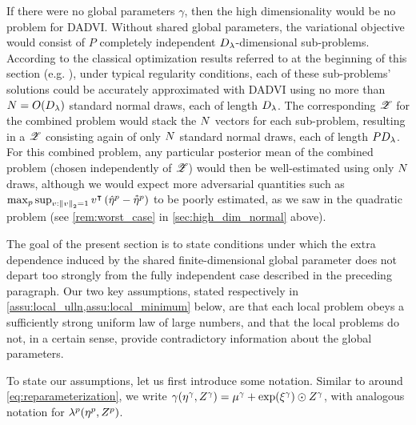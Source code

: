 If there were no global parameters $\gamma$, then the high dimensionality would
be no problem for DADVI.  Without shared global parameters, the variational
objective would consist of $P$ completely independent $D_{\lambda}$-dimensional
sub-problems.  According to the classical optimization results referred to at
the beginning of this section (e.g. \citet[Chapter 5]{shapiro:2021:lectures}),
under typical regularity conditions, each of these sub-problems' solutions could
be accurately approximated with DADVI using no more than $N=O(D_{\lambda})$
standard normal draws, each of length $D_{\lambda}$.  The corresponding $\mathscr{Z}$ for
the combined problem would stack the $N$ vectors for each sub-problem,
resulting in a $\mathscr{Z}$ consisting again of only $N$ standard normal draws, each
of length $P D_{\lambda}$.  For this combined problem, any particular posterior
mean of the combined problem (chosen independently of $\mathscr{Z}$) would then be
well-estimated using only $N$ draws, although we would expect more
adversarial quantities such as $\max_{p} \sup_{v:\left\Vert v\right\Vert_2=1}
v^\intercal\left(\hat{\eta}^p - \accentset{*}{\eta}^{p}\right)$ to be poorly estimated, as we
saw in the quadratic problem (see \cref{rem:worst_case} in
\cref{sec:high_dim_normal} above).

The goal of the present section is to state conditions under which the extra
dependence induced by the shared finite-dimensional global parameter does not
depart too strongly from the fully independent case described in the preceding
paragraph.  Our two key assumptions, stated respectively in
\cref{assu:local_ulln,assu:local_minimum} below, are that each local problem
obeys a sufficiently strong uniform law of large numbers, and that the local
problems do not, in a certain sense, provide contradictory information about the
global parameters.

To state our assumptions, let us first introduce some notation.  Similar to around
\cref{eq:reparameterization}, we write $\gamma(\eta^\gamma, Z^\gamma) =
\mu_{}^\gamma + \exp(\xi_{}^\gamma) \odot Z^\gamma$, with analogous notation
for $\lambda^p(\eta^p, Z^p)$.  

